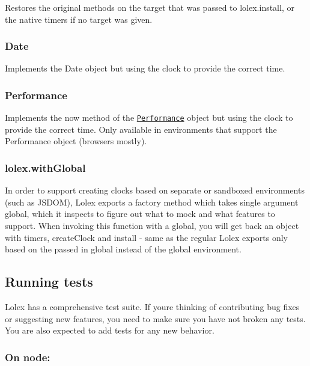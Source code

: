 Restores the original methods on the {\ttfamily target} that was passed to {\ttfamily lolex.\+install}, or the native timers if no {\ttfamily target} was given.

\subsubsection*{{\ttfamily Date}}

Implements the {\ttfamily Date} object but using the clock to provide the correct time.

\subsubsection*{{\ttfamily Performance}}

Implements the {\ttfamily now} method of the \href{https://developer.mozilla.org/en-US/docs/Web/API/Performance/now}{\tt {\ttfamily Performance}} object but using the clock to provide the correct time. Only available in environments that support the Performance object (browsers mostly).

\subsubsection*{{\ttfamily lolex.\+with\+Global}}

In order to support creating clocks based on separate or sandboxed environments (such as J\+S\+D\+OM), Lolex exports a factory method which takes single argument {\ttfamily global}, which it inspects to figure out what to mock and what features to support. When invoking this function with a global, you will get back an object with {\ttfamily timers}, {\ttfamily create\+Clock} and {\ttfamily install} -\/ same as the regular Lolex exports only based on the passed in global instead of the global environment.

\subsection*{Running tests}

Lolex has a comprehensive test suite. If you\textquotesingle{}re thinking of contributing bug fixes or suggesting new features, you need to make sure you have not broken any tests. You are also expected to add tests for any new behavior.

\subsubsection*{On node\+:}


